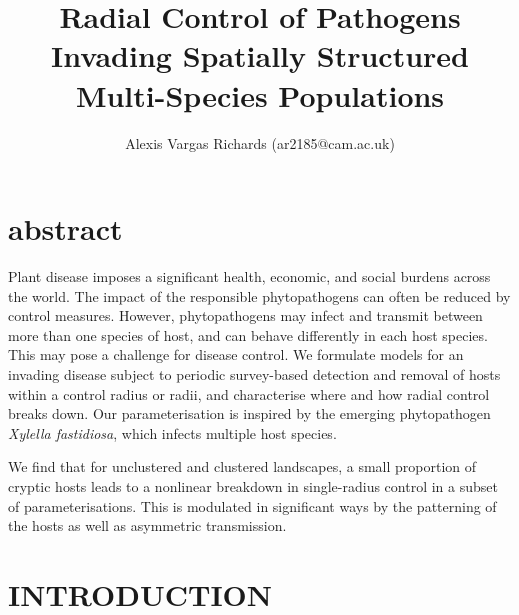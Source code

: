 \documentclass[prstpaper]{revtex4-2}
\begin{document}

\title{Radial Control of Pathogens Invading Spatially Structured Multi-Species Populations}%

\author{Alexis Vargas Richards (ar2185@cam.ac.uk)}

\maketitle

\section*{abstract}
Plant disease imposes a significant health, economic, and social burdens across the world. The impact of the responsible phytopathogens can often be reduced by control measures. However, phytopathogens may infect and transmit between more than one species of host, and can behave differently in each host species. This may pose a challenge for disease control. We formulate models for an invading disease subject to periodic survey-based detection and removal of hosts within a control radius or radii, and characterise where and how radial control breaks down. Our parameterisation is inspired by the emerging phytopathogen \emph{Xylella fastidiosa}, which infects multiple host species.

We find that for unclustered and clustered landscapes, a small proportion of cryptic hosts leads to a nonlinear breakdown in single-radius control in a subset of parameterisations. This is modulated in significant ways by the patterning of the hosts as well as asymmetric transmission.

\newpage
\section*{INTRODUCTION}
\end{document}
